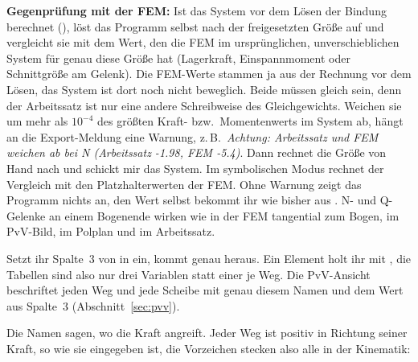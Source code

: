 \textbf{Gegenprüfung mit der FEM:} Ist das System vor dem Lösen der Bindung berechnet (),
löst das Programm  selbst nach der freigesetzten Größe auf und vergleicht sie mit
dem Wert, den die FEM im ursprünglichen, unverschieblichen System für genau diese Größe hat
(Lagerkraft, Einspannmoment oder Schnittgröße am Gelenk). Die FEM-Werte stammen ja aus der Rechnung
vor dem Lösen, das System ist dort noch nicht beweglich. Beide müssen gleich sein, denn der
Arbeitssatz ist nur eine andere Schreibweise des Gleichgewichts. Weichen sie um mehr als
$10^{-4}$ des größten Kraft- bzw.\ Momentenwerts im System ab, hängt an die Export-Meldung eine
Warnung, z.\,B.\ \emph{Achtung: Arbeitssatz und FEM weichen ab bei N (Arbeitssatz -1.98, FEM -5.4)}.
Dann rechnet die Größe von Hand nach und schickt mir das System. Im symbolischen Modus rechnet der
Vergleich mit den Platzhalterwerten der FEM. Ohne Warnung zeigt das Programm nichts an, den Wert
selbst bekommt ihr wie bisher aus . N- und Q-Gelenke an einem Bogenende wirken wie in
der FEM tangential zum Bogen, im PvV-Bild, im Polplan und im Arbeitssatz.

Setzt ihr Spalte~3 von  in  ein, kommt genau  heraus. Ein
Element holt ihr mit , die Tabellen sind also nur drei Variablen statt einer je
Weg. Die PvV-Ansicht beschriftet jeden Weg und jede Scheibe mit genau diesem Namen und dem Wert aus
Spalte~3 (Abschnitt~\ref{sec:pvv}).

Die Namen sagen, wo die Kraft angreift. Jeder Weg ist positiv in Richtung seiner Kraft, so wie sie
eingegeben ist, die Vorzeichen stecken also alle in der Kinematik:

